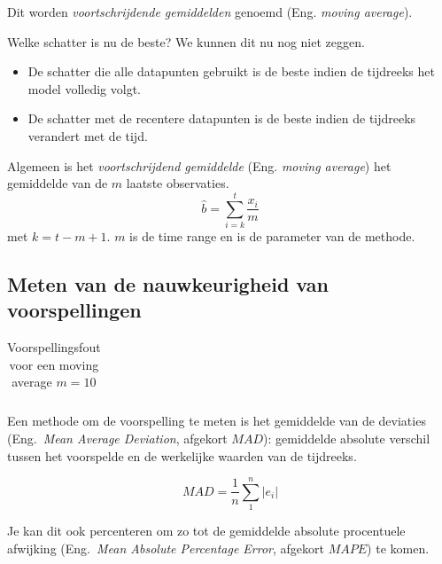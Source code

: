 Dit worden \textit{voortschrijdende gemiddelden} genoemd (Eng. \emph{moving average}). 

Welke schatter is nu de beste? We kunnen dit nu nog niet zeggen.

\begin{itemize}
\item De schatter die alle datapunten gebruikt is de beste indien de tijdreeks het model volledig volgt.
\item De schatter met de recentere datapunten is de beste indien de tijdreeks verandert met de tijd.
\end{itemize}

\begin{definition}
Algemeen is het \emph{voortschrijdend gemiddelde} (Eng. \emph{moving average}) het gemiddelde van de $m$ laatste observaties.
\begin{equation}
	\widehat{b} = \sum_{i=k}^{t} \frac{x_{i}}{m}
\label{eq:movingAverage}
\end{equation}
met $k = t-m+1$. $m$ is de time range en is de parameter van de methode.
\end{definition}

\subsection{Meten van de nauwkeurigheid van voorspellingen}

\begin{table}
  \centering
\begin{tabular}{|lllllllllll|}

\end{tabular}
\caption{Voorspellingsfout voor een moving average $m = 10$}
\label{tab:error}
\end{table}


Een methode om de voorspelling te meten is het gemiddelde van de deviaties (Eng.~\emph{Mean Average Deviation}, afgekort $MAD$): gemiddelde absolute verschil tussen het voorspelde en de werkelijke waarden van de tijdreeks.

\begin{definition}[$MAD$]
\begin{equation}
	MAD = \frac{1}{n} \sum_{1}^{n} \left| e_{i} \right|  
\label{eq:MAD}
\end{equation}
\end{definition}

Je kan dit ook percenteren om zo tot de gemiddelde absolute procentuele afwijking (Eng.~\emph{Mean Absolute Percentage Error}, afgekort $MAPE$) te komen.

